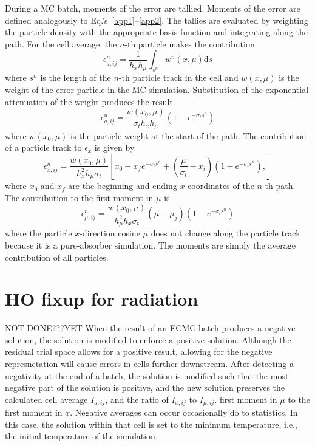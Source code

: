 \documentclass{mc2013}
\renewcommand{\d}{\mathrm{d}}
\begin{document}
During a MC batch, moments of the error are tallied.  Moments of the error are
defined analogously to Eq.'s~\eqref{app1}--\eqref{app2}.
The tallies are evaluated by weighting the particle density with the appropriate
basis function and integrating along the path.  For the cell average, the $n$-th
particle makes the contribution
\begin{equation}
    \epsilon^n_{a,ij} = \frac{1}{h_xh_\mu} \int_{s^n}  w^n(x,\mu) \d s
\end{equation}
where $s^n$ is the length of the $n$-th particle track in the cell and $w(x,\mu)$ is the weight of the error particle in the MC simulation.
Substitution of the exponential attenuation of the weight produces the result
\begin{equation}
    \epsilon^n_{a,ij} = \frac{w(x_0,\mu)}{\sigma_t h_x h_\mu} \left(1 - e^{-\sigma_ts^n}\right)
\end{equation}
where $w(x_0,\mu)$ is the particle weight at the start of the path. The contribution of a
particle track to $\epsilon_x$ is given by
\begin{equation}
    \epsilon^n_{x,ij} = \frac{w(x_0,\mu)}{h_x^2h_\mu \sigma_t} \left[x_0 - x_f e^{-\sigma_t s^n}
        + \left(\frac{\mu}{\sigma_t} - x_i \right)\left(1-e^{-\sigma_t s^n}\right),
    \right]
\end{equation}
where $x_0$ and $x_f$ are the beginning and ending $x$ coordinates of the $n$-th
path.  The contribution to the first moment in $\mu$ is 
\begin{equation}
    \epsilon^n_{\mu,ij} = \frac{w(x_0,\mu)}{h_{\mu}^2h_x\sigma_t}\left(\mu - \mu_j\right) \left(1 - e^{-\sigma_ts^n}\right)
\end{equation}
where the particle $x$-direction cosine $\mu$ does not change along the particle
track because it is a pure-absorber simulation.
The moments are simply the average contribution of all particles.

\section{HO fixup for radiation}

NOT DONE???YET
When the result of an ECMC batch produces a negative solution, the solution is
modified to enforce a positive solution.  Although the residual trial space allows
for a positive result, allowing for the negative represnetation will cause errors in
cells further downstream.  After detecting a negativity at the end of a batch, the
solution is modified such that the most negative part of the solution is positive,
and the new solution  preserves the calculated cell average $I_{a,ij}$, and the ratio of
$I_{x,ij}$ to $I_{\mu,ij}$. 
first moment in $\mu$ to the first moment in $x$.  Negative averages can occur
occasionally do to statistics.  In this case, the solution within that cell is set to
the minimum temperature, i.e., the initial temperature of the simulation.
\end{document}
